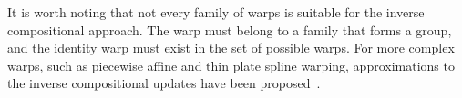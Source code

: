 It is worth noting that not every family of warps is suitable for the inverse
compositional approach. The warp must belong to a family that forms a group, and
the identity warp must exist in the set of possible warps. For more complex
warps, such as piecewise affine and thin plate spline warping, approximations to
the inverse compositional updates have been
proposed~\cite{matthews2004active,papandreou2008adaptive}.


